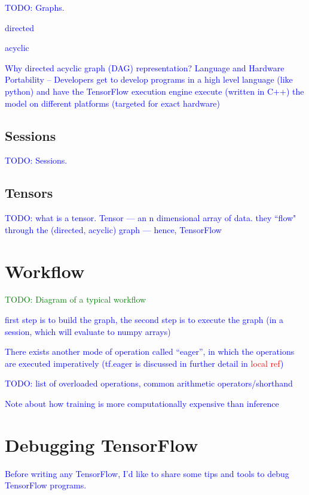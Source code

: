 \textcolor{blue}{TODO: Graphs.}

\textcolor{blue}{directed}

\textcolor{blue}{acyclic}

\textcolor{blue}{Why directed acyclic graph (DAG) representation? Language and Hardware Portability -- Developers get to develop programs in a high level language (like python) and have the TensorFlow execution engine execute (written in C++) the model on different platforms (targeted for exact hardware)}

\subsection{Sessions}

\textcolor{blue}{TODO: Sessions.}

\subsection{Tensors}

\textcolor{blue}{TODO: what is a tensor. Tensor --- an n dimensional array of data. they ``flow" through the (directed, acyclic) graph --- hence, TensorFlow}

\section{Workflow}

\textcolor{green}{TODO: Diagram of a typical workflow}

\textcolor{blue}{first step is to build the graph, the second step is to execute the graph (in a session, which will evaluate to numpy arrays)}

\textcolor{blue}{There exists another mode of operation called ``eager'', in which the operations are executed imperatively (tf.eager is discussed in further detail in \textcolor{red}{local ref})}

\textcolor{blue}{TODO: list of overloaded operations, common arithmetic operators/shorthand}

\textcolor{blue}{Note about how training is more computationally expensive than inference}

\section{Debugging TensorFlow}

\textcolor{blue}{Before writing any TensorFlow, I'd like to share some tips and tools to debug TensorFlow programs.}


